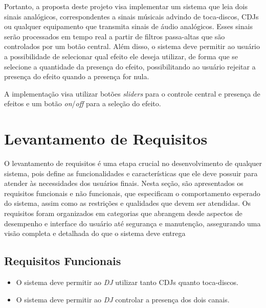 \par
Portanto, a proposta deste projeto visa implementar um sistema que leia dois sinais analógicos, correspondentes a sinais músicais advindo de toca-discos, CDJs ou qualquer equipamento que transmita sinais de áudio analógicos. Esses sinais serão processados em tempo real a partir de filtros passa-altas que são controlados por um botão central. Além disso, o sistema deve permitir ao usuário a possibilidade de selecionar qual efeito ele deseja utilizar, de forma que se selecione a quantidade da presença do efeito, possibilitando ao usuário rejeitar a presença do efeito quando a presença for nula.
\par
A implementação visa utilizar botões \textit{sliders} para o controle central e presença de efeitos e um botão \textit{on}/\textit{off} para a seleção do efeito. 

\section{Levantamento de Requisitos}

O levantamento de requisitos é uma etapa crucial no desenvolvimento de qualquer sistema, pois define as funcionalidades e características que ele deve possuir para atender às necessidades dos usuários finais. Nesta seção, são apresentados os requisitos funcionais e não funcionais, que especificam o comportamento esperado do sistema, assim como as restrições e qualidades que devem ser atendidas. Os requisitos foram organizados em categorias que abrangem desde aspectos de desempenho e interface do usuário até segurança e manutenção, assegurando uma visão completa e detalhada do que o sistema deve entrega

\subsection{Requisitos Funcionais}
\begin{itemize}
    \item O sistema deve permitir ao \textit{DJ} utilizar tanto CDJs quanto toca-discos.
    \item O sistema deve permitir ao \textit{DJ} controlar a presença dos dois canais.
\end{itemize}

